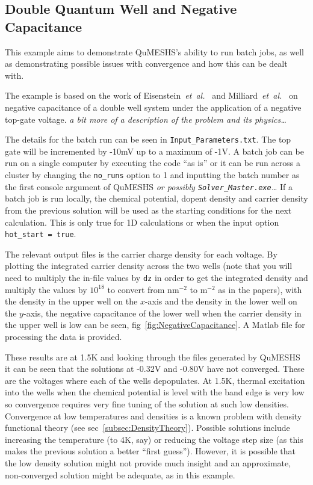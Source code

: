 \documentclass[12pt]{article}
\newcommand{\red}[1]{{\color{red} \it #1}}
\begin{document}
\subsection{Double Quantum Well and Negative Capacitance}
\label{subsec:NegativeCapacitance}

This example aims to demonstrate QuMESHS's ability to run batch jobs, as well
as demonstrating possible issues with convergence and how this can be dealt with.

The example is based on the work of Eisenstein~\emph{et~al.}~\cite{Eisenstein:????}
and Milliard~\emph{et~al.}~\cite{Millard:1997} on negative capacitance of a
double well system under the application of a negative top-gate voltage.
\red{a bit more of a description of the problem and its physics\ldots}

The details for the batch run can be seen in \texttt{Input\_Parameters.txt}.
The top gate will be incremented by -10mV up to a maximum of -1V.  A batch job
can be run on a single computer by executing the code ``as is'' or it can be
run across a cluster by changing the \texttt{no\_runs} option to 1 and inputting
the batch number as the first console argument of QuMESHS \red{or possibly
\texttt{Solver\_Master.exe}\ldots}  If a batch job is run locally, the chemical
potential, dopent density and carrier density from the previous solution will
be used as the starting conditions for the next calculation.  This is only
true for 1D calculations or when the input option \texttt{hot\_start = true}.

The relevant output files is the carrier charge density for each voltage.  By
plotting the integrated carrier density across the two wells (note that you will
need to multiply the in-file values by \texttt{dz} in order to get the integrated
density and multiply the values by $10^{18}$ to convert from nm$^{-2}$ to
m$^{-2}$ as in the papers), with the density in the upper well on the $x$-axis
and the density in the lower well on the $y$-axis, the negative capacitance of
the lower well when the carrier density in the upper well is low can be seen,
fig~\ref{fig:NegativeCapacitance}.  A Matlab file for processing the data is
provided.

These results are at 1.5K and looking through the files generated by QuMESHS
it can be seen that the solutions at -0.32V and -0.80V have not converged.
These are the voltages where each of the wells depopulates.  At 1.5K, thermal
excitation into the wells when the chemical potential is level with the band
edge is very low so convergence requires very fine tuning of the solution at
such low densities.  Convergence at low temperatures and densities is a known
problem with density functional theory (see sec~\ref{subsec:DensityTheory}).
Possible solutions include increasing the temperature (to 4K, say) or reducing
the voltage step size (as this makes the previous solution a better ``first
guess'').  However, it is possible that the low density solution might not
provide much insight and an approximate, non-converged solution might be
adequate, as in this example.
\end{document}
